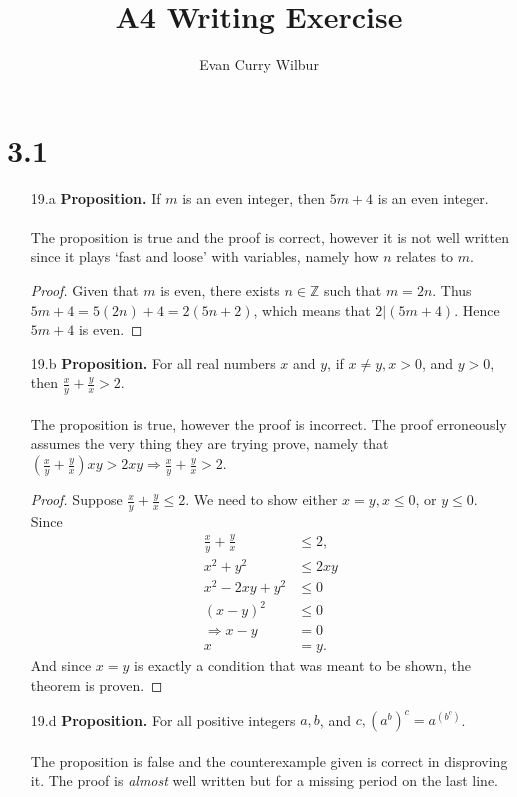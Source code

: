 \documentclass[]{article}
\title{A4 Writing Exercise}
\author{Evan Curry Wilbur}
\begin{document}
\maketitle

\section*{3.1}
\begin{itemize}
	\item[19.a] \textbf{Proposition.} If $m$ is an even integer, then $5m + 4$ is an even integer. \\
	\\
	The proposition is true and the proof is correct, however it is not well written since it plays `fast and loose' with variables, namely how $n$ relates to $m$.
	\begin{proof} Given that $m$ is even, there exists $n \in \mathbb{Z}$ such that $m = 2n$. Thus $5m + 4 = 5(2n) + 4 = 2(5n+2)$, which means that $2 | (5m + 4)$. Hence $5m + 4$ is even.
	\end{proof}
	\item[19.b] \textbf{Proposition.} For all real numbers $x$ and $y$, if $x \neq y, x > 0$, and $y > 0$, then $\frac{x}{y} + \frac{y}{x} > 2$. \\
	\\
	The proposition is true, however the proof is incorrect. The proof erroneously assumes the very thing they are trying prove, namely that $\left(\frac{x}{y} + \frac{y}{x}\right)xy > 2xy \Rightarrow \frac{x}{y} + \frac{y}{x} > 2$.
	
	\begin{proof}
		Suppose $\frac{x}{y} + \frac{y}{x} \leq 2$. We need to show either $x = y, x \leq 0$, or $y \leq 0$. Since
		\begin{align*}
			\frac{x}{y} + \frac{y}{x} &\leq 2, \\
			x^2 + y^2 &\leq 2xy \\
			x^2 - 2xy + y^2 &\leq 0 \\
			(x - y)^2 &\leq 0 \\
			\Rightarrow x - y &= 0 \\
			x &= y.
		\end{align*}
	And since $x = y$ is exactly a condition that was meant to be shown, the theorem is proven.
	\end{proof}
	\item[19.d] \textbf{Proposition.} For all positive integers $a, b$, and $c, \left(a^b\right)^c = a^{\left(b^c\right)}$. \\
	\\
	The proposition is false and the counterexample given is correct in disproving it. The proof is \textit{almost} well written but for a missing period on the last line.
\end{itemize}
\end{document}
